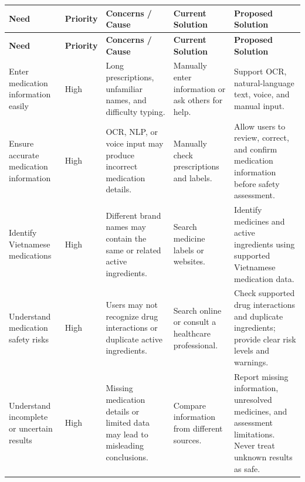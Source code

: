 \begin{longtable}{|
    L{0.21\textwidth}|
    L{0.09\textwidth}|
    L{0.20\textwidth}|
    L{0.20\textwidth}|
    L{0.20\textwidth}|
}
\hline
\textbf{Need} &
\textbf{Priority} &
\textbf{Concerns / Cause} &
\textbf{Current Solution} &
\textbf{Proposed Solution}\\
\hline
\endfirsthead

\hline
\textbf{Need} &
\textbf{Priority} &
\textbf{Concerns / Cause} &
\textbf{Current Solution} &
\textbf{Proposed Solution}\\
\hline
\endhead


Enter medication information easily
& High
& Long prescriptions, unfamiliar names,
and difficulty typing.
& Manually enter information or ask others for help.
& Support OCR, natural-language text,
voice, and manual input.
\\ \hline

Ensure accurate medication information
& High
& OCR, NLP, or voice input may produce
incorrect medication details.
& Manually check prescriptions and labels.
& Allow users to review, correct,
and confirm medication information
before safety assessment.
\\ \hline


Identify Vietnamese medications
& High
& Different brand names may contain
the same or related active ingredients.
& Search medicine labels or websites.
& Identify medicines and active ingredients
using supported Vietnamese medication data.
\\ \hline

Understand medication safety risks
& High
& Users may not recognize drug interactions
or duplicate active ingredients.
& Search online or consult a healthcare professional.
& Check supported drug interactions and
duplicate ingredients; provide clear
risk levels and warnings.
\\ \hline

Understand incomplete or uncertain results
& High
& Missing medication details or limited data
may lead to misleading conclusions.
& Compare information from different sources.
& Report missing information, unresolved
medicines, and assessment limitations.
Never treat unknown results as safe.
\\ \hline


\end{longtable}
